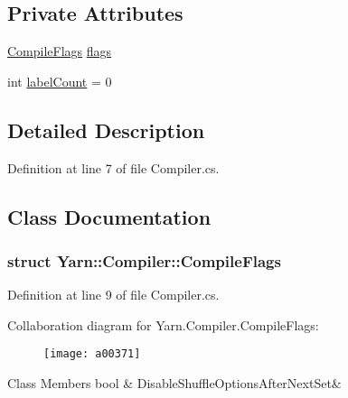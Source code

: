 \subsection*{Private Attributes}
\begin{DoxyCompactItemize}
\item 
\hyperlink{a00044_a00357}{Compile\-Flags} \hyperlink{a00044_a541022d89bcf9bc8f794eb6d6b438d08}{flags}
\item 
int \hyperlink{a00044_a87758397eba2e84cda8e0d6c40656f3f}{label\-Count} = 0
\end{DoxyCompactItemize}


\subsection{Detailed Description}


Definition at line 7 of file Compiler.\-cs.



\subsection{Class Documentation}
\label{a00357}
\hypertarget{a00044_a00357}{}
\subsubsection{struct Yarn\-:\-:Compiler\-:\-:Compile\-Flags}


Definition at line 9 of file Compiler.\-cs.



Collaboration diagram for Yarn.\-Compiler.\-Compile\-Flags\-:
\nopagebreak
\begin{figure}[H]
\begin{center}
\leavevmode
\texttt{[image: a00371]}
\end{center}
\end{figure}
\begin{DoxyFields}{Class Members}
\hypertarget{a00044_a8b49bb7763ff477cba21d7c771ef3ed0}{bool}\label{a00044_a8b49bb7763ff477cba21d7c771ef3ed0}
&
Disable\-Shuffle\-Options\-After\-Next\-Set&
\\
\hline

\end{DoxyFields}


